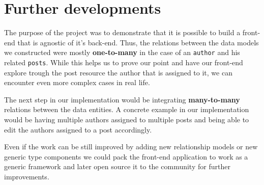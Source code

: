 \section{Further developments}
\label{sec:further-developments}

The purpose of the project was to demonstrate that it is possible to build a front-end that is agnostic of it's back-end. Thus, the relations between the data models we constructed were mostly \textbf{one-to-many} in the case of an \texttt{author} and his related \texttt{posts}. While this helps us to prove our point and have our front-end explore trough the post resource the author that is assigned to it, we can encounter even more complex cases in real life.

The next step in our implementation would be integrating \textbf{many-to-many} relations between the data entities. A concrete example in our implementation would be having multiple authors assigned to multiple posts and being able to edit the authors assigned to a post accordingly.

Even if the work can be still improved by adding new relationship models or new generic type components we could pack the front-end application to work as a generic framework and later open source it to the community for further improvements.